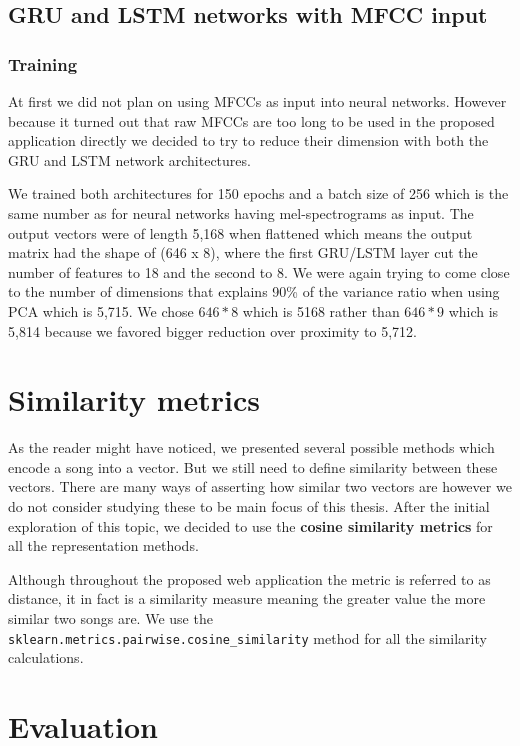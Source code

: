 \subsection{GRU and LSTM networks with MFCC input}\label{ssec:GRU_LSTM_MFCC_experiments}

\subsubsection{Training}
At first we did not plan on using MFCCs as input into neural networks. However because it turned out that raw MFCCs are too long to be used in the proposed application directly we decided to try to reduce their dimension with both the GRU and LSTM network architectures. 

We trained both architectures for 150 epochs and a batch size of 256 which is the same number as for neural networks having mel-spectrograms as input. The output vectors were of length 5,168 when flattened which means the output matrix had the shape of (646 x 8), where the first GRU/LSTM layer cut the number of features to 18 and the second to 8. We were again trying to come close to the number of dimensions that explains 90\% of the variance ratio when using PCA which is 5,715. We chose $646*8$ which is 5168 rather than $646*9$ which is 5,814 because we favored bigger reduction over proximity to 5,712.

\section{Similarity metrics}\label{sec:similarity_metrics}
As the reader might have noticed, we presented several possible methods which encode a song into a vector. But we still need to define similarity between these vectors. There are many ways of asserting how similar two vectors are however we do not consider studying these to be main focus of this thesis. After the initial exploration of this topic, we decided to use the \textbf{cosine similarity metrics} for all the representation methods. 

Although throughout the proposed web application the metric is referred to as distance, it in fact is a similarity measure meaning the greater value the more similar two songs are. We use the \texttt{sklearn.metrics.pairwise.cosine\_similarity} method for all the similarity calculations.

\section{Evaluation}\label{sec:evaluation}

